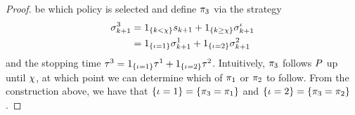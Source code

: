 \begin{proof}
    be which policy is selected and define $\pi_3$ via
    the strategy
    \begin{align*}
        \sigma_{k+1}^3
        &=
        1_{
            \left\{
                k<\chi
            \right\}
        }
        s_{k+1}
        +
        1_{
            \left\{
                k\geq\chi
            \right\}
        }
        \sigma_{k+1}^\iota
        \\
        &=
        1_{
            \left\{
                \iota=1
            \right\}
        }
        \sigma_{k+1}^1
        +
        1_{
            \left\{
                \iota=2
            \right\}
        }
        \sigma_{k+1}^2
    \end{align*}  
    and the stopping time 
    \(
        \tau^3
        =
        1_{
            \left\{
                \iota=1
            \right\}
        }
        \tau^1
        +
        1_{
            \left\{
                \iota=2
            \right\}
        }
        \tau^2
    \). 
    Intuitively, $\pi_3$ follows $P$ up until
    $\chi$, at which point we can determine which of 
    $\pi_1$ or $\pi_2$ to follow.
    From the construction above, we have that 
    \(
        \left\{
            \iota=1
        \right\}
        =
        \left\{
            \pi_3
            =
            \pi_1
        \right\}
    \)
    and 
    \(
        \left\{
            \iota=2
        \right\}
        =
        \left\{
            \pi_3
            =
            \pi_2
        \right\}
    \).


\end{proof}
